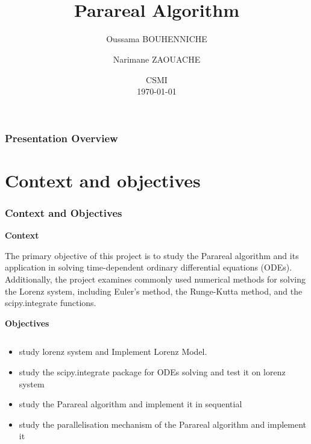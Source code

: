 \documentclass[
	11pt,
]{beamer}
\title[Parareal Algorithm]{\\ \textbf{Parareal Algorithm}}
\author[O. BOUHENNICHE \and N. ZAOUACHE]{Oussama BOUHENNICHE \and Narimane ZAOUACHE}
\institute[]{University of Strasbourg}
\date[\today]{ CSMI \\ \today}
\newcommand\myheading[1]{%
  \par\bigskip
  {\Large\bfseries#1}\par\smallskip}
\begin{document}

\begin{frame}
	\titlepage
\end{frame}


\begin{frame}
	\frametitle{Presentation Overview}

	\tableofcontents
\end{frame}
\section{Context and objectives}

\begin{frame}
	\frametitle{Context and Objectives}
	\myheading{Context}
          The primary objective of this project is to study the Parareal algorithm and its application in solving time-dependent ordinary differential equations (ODEs). Additionally, the project examines commonly used numerical methods for solving the Lorenz system, including Euler’s method, the Runge-Kutta method, and the scipy.integrate functions.

	\myheading{Objectives}

	\begin{columns}[c]
		\begin{column}{\textwidth}
			\begin{itemize}
                   \item study lorenz system and Implement Lorenz Model.
                   \item study the scipy.integrate package for ODEs solving and test it on lorenz system
                   \item study the Parareal algorithm and implement it in sequential
                   \item  study the parallelisation mechanism of the Parareal algorithm and implement it
               \end{itemize}
		\end{column}

	\end{columns}

\end{frame}
\end{document}
